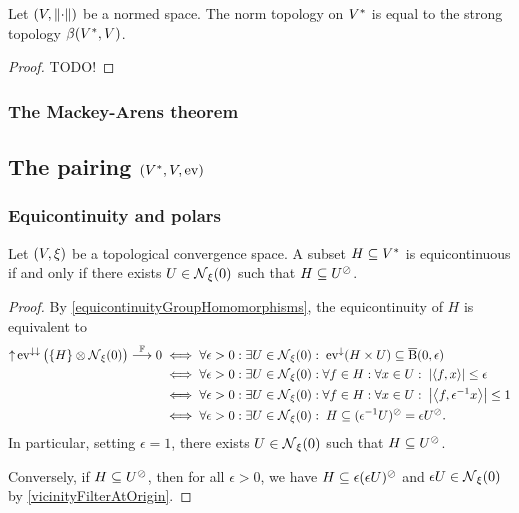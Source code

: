 \begin{proposition} \label{dualNormTopologyStrong}
Let $\left( V, \lVert\cdot\rVert \right)$ be a normed space. The norm topology on ${V}^*$ is equal to the strong topology $\beta({V}^*, V)$.
\end{proposition}
\begin{proof}
TODO!
\end{proof}

\subsubsection{The Mackey-Arens theorem}

\subsection{The pairing $\left( V^*, V, \operatorname{ev} \right)$}
\subsubsection{Equicontinuity and polars}
\begin{proposition} \label{equicontinuityTopologicalFunctionals}
Let $\left( V, \xi \right)$ be a topological convergence space. A subset $H\subseteq {V}^*$ is equicontinuous \textup{if and only if} there exists $U\in \operatorname{\mathcal{N}}_\xi(0)$ such that $H\subseteq U^\oslash$.
\end{proposition}
\begin{proof}
By \ref{equicontinuityGroupHomomorphisms}, the equicontinuity of $H$ is equivalent to
\begin{align*}
\operatorname{\uparrow}\operatorname{ev}^{\downarrow\downarrow}\big(\{H\}\otimes \operatorname{\mathcal{N}}_\xi(0)\big) \overset{\mathbb{F}}{\longrightarrow} 0 &\iff \forall \epsilon >0: \exists U\in \operatorname{\mathcal{N}}_\xi(0): \; \operatorname{ev}^\downarrow(H\times U) \subseteq \operatorname{\overline{B}}(0,\epsilon) \\
&\iff \forall \epsilon >0: \exists U\in \operatorname{\mathcal{N}}_\xi(0): \forall f\in H: \forall x\in U: \; \left|\left\langle f,x \right\rangle\right|\leq \epsilon \\
&\iff \forall \epsilon >0: \exists U\in \operatorname{\mathcal{N}}_\xi(0): \forall f\in H: \forall x\in U: \; \left|\left\langle f,\epsilon^{-1}x \right\rangle\right|\leq 1 \\
&\iff \forall \epsilon >0: \exists U\in \operatorname{\mathcal{N}}_\xi(0): \;H\subseteq (\epsilon^{-1}U)^\oslash = \epsilon U^\oslash.
\end{align*}
In particular, setting $\epsilon =1$, there exists $U\in \operatorname{\mathcal{N}}_\xi(0)$ such that $H\subseteq U^\oslash$. 

Conversely, if $H\subseteq U^\oslash$, then for all $\epsilon > 0$, we have $H \subseteq \epsilon (\epsilon U)^\oslash$ and $\epsilon U\in \operatorname{\mathcal{N}}_\xi(0)$ by \ref{vicinityFilterAtOrigin}.
\end{proof}

